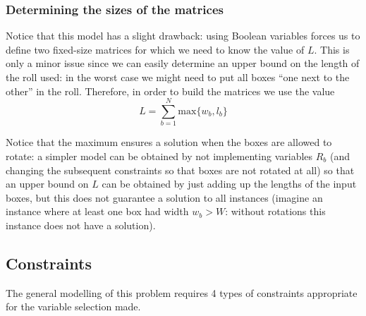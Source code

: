\subsubsection{Determining the sizes of the matrices}
\label{sec:modelling:variables:value-L}

Notice that this model has a slight drawback: using Boolean variables forces us to define
two fixed-size matrices for which we need to know the value of $L$. This is only a minor
issue since we can easily determine an upper bound on the length of the roll used: in the
worst case we might need to put all boxes ``one next to the other'' in the roll. Therefore,
in order to build the matrices we use the value
\begin{equation}
\label{eq:upper-bound-L}
L = \sum_{b=1}^N \text{max}\{w_b, l_b\}
\end{equation}

Notice that the maximum ensures a solution when the boxes are allowed to rotate: a simpler
model can be obtained by not implementing variables $R_b$ (and changing the subsequent
constraints so that boxes are not rotated at all) so that an upper bound on $L$ can be
obtained by just adding up the lengths of the input boxes, but this does not guarantee
a solution to all instances (imagine an instance where at least one box had width $w_b > W$:
without rotations this instance does not have a solution).

\subsection{Constraints}
\label{sec:modelling:constraints}

The general modelling of this problem requires 4 types of constraints
appropriate for the variable selection made.

